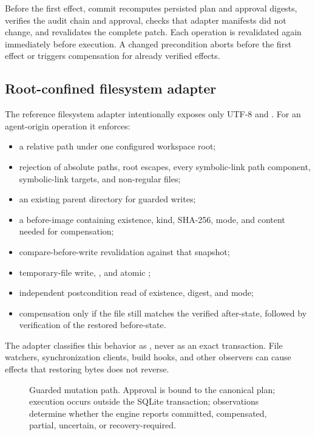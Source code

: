 Before the first effect, commit recomputes persisted plan and approval digests, verifies the audit chain and approval, checks that adapter manifests did not change, and revalidates the complete patch. Each operation is revalidated again immediately before execution. A changed precondition aborts before the first effect or triggers compensation for already verified effects.

\subsection{Root-confined filesystem adapter}

The reference filesystem adapter intentionally exposes only UTF-8  and . For an agent-origin operation it enforces:

\begin{itemize}
  \item a relative path under one configured workspace root;
  \item rejection of absolute paths, root escapes, every symbolic-link path component, symbolic-link targets, and non-regular files;
  \item an existing parent directory for guarded writes;
  \item a before-image containing existence, kind, SHA-256, mode, and content needed for compensation;
  \item compare-before-write revalidation against that snapshot;
  \item temporary-file write, , and atomic ;
  \item independent postcondition read of existence, digest, and mode;
  \item compensation only if the file still matches the verified after-state, followed by verification of the restored before-state.
\end{itemize}

The adapter classifies this behavior as , never as an exact transaction. File watchers, synchronization clients, build hooks, and other observers can cause effects that restoring bytes does not reverse.

\begin{figure}[t]
  \centering
  
  \caption{Guarded mutation path. Approval is bound to the canonical plan; execution occurs outside the SQLite transaction; observations determine whether the engine reports committed, compensated, partial, uncertain, or recovery-required.}
  \label{fig:action-flow}
\end{figure}

